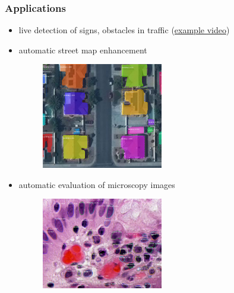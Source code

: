 \begin{frame}[<only@+>][t]
  \frametitle{Applications}
  \begin{itemize}
  \item live detection of signs, obstacles in traffic
    (\href{images/mask_rcnn_demonstration.mp4}{example video})
  \item automatic street map enhancement
    \begin{figure}
      \centering
      \includegraphics[width=0.5\textwidth]{mapping_challenge}
    \end{figure}
  \item automatic evaluation of microscopy images
    \begin{figure}
      \centering
      \includegraphics[width=0.5\textwidth]{nucleus_segmentation}
    \end{figure}
  \end{itemize}
\end{frame}

